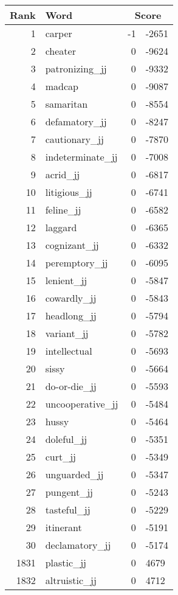 \begin{longtable}[!htbp]{| rlr@{.}l |}
    \hline
    \textbf{Rank} & \textbf{Word} & \multicolumn{2}{c|}{\textbf{Score}} \\
    \hline
    \endhead
    1 & carper & -1 & -2651 \\
    2 & cheater & 0 & -9624 \\
    3 & patronizing\_jj & 0 & -9332 \\
    4 & madcap & 0 & -9087 \\
    5 & samaritan & 0 & -8554 \\
    6 & defamatory\_jj & 0 & -8247 \\
    7 & cautionary\_jj & 0 & -7870 \\
    8 & indeterminate\_jj & 0 & -7008 \\
    9 & acrid\_jj & 0 & -6817 \\
    10 & litigious\_jj & 0 & -6741 \\
    11 & feline\_jj & 0 & -6582 \\
    12 & laggard & 0 & -6365 \\
    13 & cognizant\_jj & 0 & -6332 \\
    14 & peremptory\_jj & 0 & -6095 \\
    15 & lenient\_jj & 0 & -5847 \\
    16 & cowardly\_jj & 0 & -5843 \\
    17 & headlong\_jj & 0 & -5794 \\
    18 & variant\_jj & 0 & -5782 \\
    19 & intellectual & 0 & -5693 \\
    20 & sissy & 0 & -5664 \\
    21 & do-or-die\_jj & 0 & -5593 \\
    22 & uncooperative\_jj & 0 & -5484 \\
    23 & hussy & 0 & -5464 \\
    24 & doleful\_jj & 0 & -5351 \\
    25 & curt\_jj & 0 & -5349 \\
    26 & unguarded\_jj & 0 & -5347 \\
    27 & pungent\_jj & 0 & -5243 \\
    28 & tasteful\_jj & 0 & -5229 \\
    29 & itinerant & 0 & -5191 \\
    30 & declamatory\_jj & 0 & -5174 \\
    1831 & plastic\_jj & 0 & 4679 \\
    1832 & altruistic\_jj & 0 & 4712 \\

\end{longtable}
